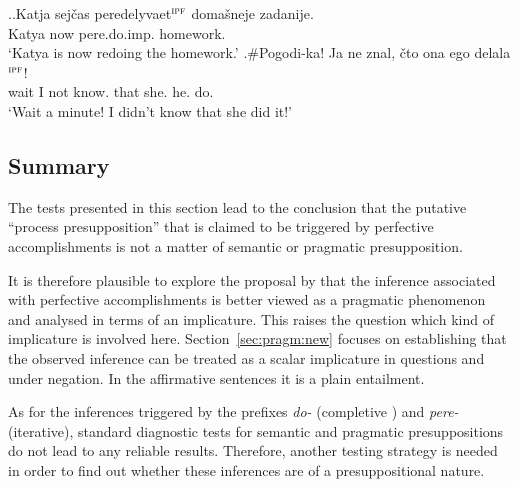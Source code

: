 \ex.\ag.\label{ex:home:pere}Katja sej\v{c}as peredelyvaet$^{\textsc{ipf}}$ {doma\v{s}neje zadanije}.\\
Katya now pere.do.imp. homework.\\
\trans `Katya is now redoing the homework.'
\bg.\#Pogodi-ka! Ja ne znal, \v{c}to ona ego delala$^{\textsc{ipf}}$!\label{ex:wait:pere}\\
wait I not know. that she. he. do.\\
\trans `Wait a minute! I didn't know that she did it!'

\subsection{Summary}
The tests presented in this section lead to the conclusion that the putative ``process presupposition'' that is claimed to be triggered by perfective accomplishments is not a matter of semantic or pragmatic presupposition.

It is therefore plausible to explore the proposal by \citet{Gronn:04, Gronn:06} that the inference associated with perfective accomplishments is better viewed as a pragmatic phenomenon and analysed in terms of an implicature.
This raises the question which kind of implicature is involved here. Section~\ref{sec:pragm:new} focuses on establishing that the observed inference can be treated as a scalar implicature in questions and under negation. In the affirmative sentences it is a plain entailment.

As for the inferences triggered by the prefixes \textit{do-}   (completive ) and \textit{pere-}   (iterative), standard diagnostic tests for semantic and pragmatic presuppositions do not lead to any reliable results. Therefore, another testing strategy is needed in order to find out whether these inferences are of a presuppositional nature. 

